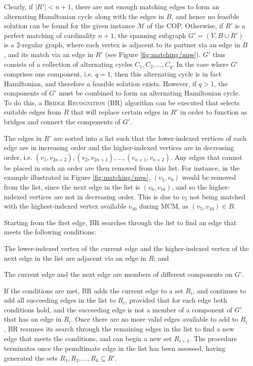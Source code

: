 \documentclass[oribibl]{llncs}
\begin{document}
Clearly, if $|R'| < n+1$, there are not enough matching edges to form an alternating Hamiltonian cycle along with the edges in $B$, and hence no feasible solution can be found for the given instance $\mathcal{M}$ of the COP. Otherwise, if $R'$ is a perfect matching of cardinality $n+1$, the spanning subgraph $G'=(V, B \cup R')$ is a 2-regular graph, where each vertex is adjacent to its partner via an edge in $B$, and its match via an edge in $R'$ (see Figure \ref{fig:matching/mps}). $G'$ thus consists of a collection of alternating cycles $C_1, C_2, ..., C_q$. In the case where $G'$ comprises one component, i.e. $q = 1$, then this alternating cycle is in fact Hamiltonian, and therefore a feasible solution exists. However, if $q > 1$, the components of $G'$ must be combined to form an alternating Hamiltonian cycle. To do this, a \textsc{Bridge Recognition} (BR) algorithm can be executed that selects suitable edges from $R$ that will replace certain edges in $R'$ in order to function as bridges and connect the components of $G'$.

The edges in $R'$ are sorted into a list such that the lower-indexed vertices of each edge are in increasing order and the higher-indexed vertices are in decreasing order, i.e. $(v_1, v_{2n+2}), (v_2, v_{2n+1}), ..., (v_{n+1}, v_{n+2})$. Any edges that cannot be placed in such an order are then removed from this list. For instance, in the example illustrated in Figure \ref{fig:matching/mps}, $(v_5, v_9)$ would be removed from the list, since the next edge in the list is $(v_6, v_{10})$, and so the higher-indexed vertices are not in decreasing order. This is due to $v_5$ not being matched with the highest-indexed vertex available $v_{10}$ during MCM, as $(v_5, v_{10}) \in B$.

Starting from the first edge, BR searches through the list to find an edge that meets the following conditions: 
\begin{enumerate*}[label={(\alph*)}]
	\item The lower-indexed vertex of the current edge and the higher-indexed vertex of the next edge in the list are adjacent via an edge in $R$; and
	\item The current edge and the next edge are members of different components on $G'$.
\end{enumerate*}

If the conditions are met, BR adds the current edge to a set $R_i$, and continues to add all succeeding edges in the list to $R_i$, provided that for each edge both conditions hold, and the succeeding edge is not a member of a component of $G'$ that has an edge in $R_i$. Once there are no more valid edges available to add to $R_i$, BR resumes its search through the remaining edges in the list to find a new edge that meets the conditions, and can begin a new set $R_{i+1}$. The procedure terminates once the penultimate edge in the list has been assessed, having generated the sets $R_1, R_2, ..., R_k \subseteq R'$.
\end{document}
